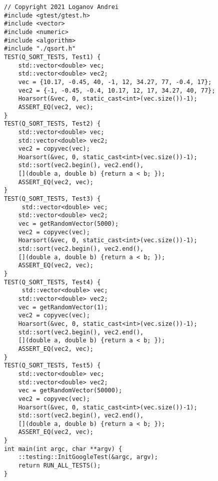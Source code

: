 \documentclass{report}
\begin{document}
\begin{lstlisting}
// Copyright 2021 Loganov Andrei
#include <gtest/gtest.h>
#include <vector>
#include <numeric>
#include <algorithm>
#include "./qsort.h"
TEST(Q_SORT_TESTS, Test1) {
    std::vector<double> vec;
    std::vector<double> vec2;
    vec = {10.17, -0.45, 40, -1, 12, 34.27, 77, -0.4, 17};
    vec2 = {-1, -0.45, -0.4, 10.17, 12, 17, 34.27, 40, 77};
    Hoarsort(&vec, 0, static_cast<int>(vec.size())-1);
    ASSERT_EQ(vec2, vec);
}
TEST(Q_SORT_TESTS, Test2) {
    std::vector<double> vec;
    std::vector<double> vec2;
    vec2 = copyvec(vec);
    Hoarsort(&vec, 0, static_cast<int>(vec.size())-1);
    std::sort(vec2.begin(), vec2.end(),
    [](double a, double b) {return a < b; });
    ASSERT_EQ(vec2, vec);
}
TEST(Q_SORT_TESTS, Test3) {
     std::vector<double> vec;
    std::vector<double> vec2;
    vec = getRandomVector(5000);
    vec2 = copyvec(vec);
    Hoarsort(&vec, 0, static_cast<int>(vec.size())-1);
    std::sort(vec2.begin(), vec2.end(),
    [](double a, double b) {return a < b; });
    ASSERT_EQ(vec2, vec);
}
TEST(Q_SORT_TESTS, Test4) {
     std::vector<double> vec;
    std::vector<double> vec2;
    vec = getRandomVector(1);
    vec2 = copyvec(vec);
    Hoarsort(&vec, 0, static_cast<int>(vec.size())-1);
    std::sort(vec2.begin(), vec2.end(),
    [](double a, double b) {return a < b; });
    ASSERT_EQ(vec2, vec);
}
TEST(Q_SORT_TESTS, Test5) {
    std::vector<double> vec;
    std::vector<double> vec2;
    vec = getRandomVector(50000);
    vec2 = copyvec(vec);
    Hoarsort(&vec, 0, static_cast<int>(vec.size())-1);
    std::sort(vec2.begin(), vec2.end(),
    [](double a, double b) {return a < b; });
    ASSERT_EQ(vec2, vec);
}
int main(int argc, char **argv) {
    ::testing::InitGoogleTest(&argc, argv);
    return RUN_ALL_TESTS();
}

\end{lstlisting}
\end{document}
